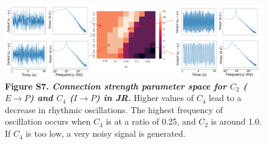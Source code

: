 \documentclass[12pt,twoside]{article}
\begin{document}
\begin{figure}[H]
    \hspace{-1cm}
    \includegraphics[scale=0.7]{Images/JR_Zoom_C2C4_full_new.png}
    \caption*{\textbf{Figure S7. \textit{Connection strength parameter space for $C_{2}$ ($E \rightarrow P$) and $C_{4}$ ($I \rightarrow P$) in JR.}} Higher values of  $C_{4}$ lead to a decrease in rhythmic oscillations. The highest frequency of oscillation occurs when $C_{4}$ is at a ratio of 0.25, and $C_{2}$ is around 1.0. If $C_{4}$ is too low, a very noisy signal is generated.} \label{fig:JR_Czoomed}
\end{figure}



\vspace{1cm}
\end{document}
